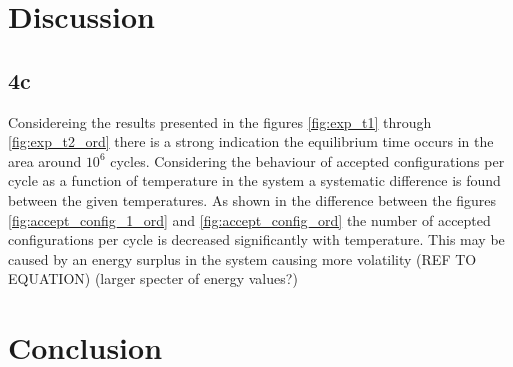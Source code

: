 \documentclass[12pt]{article}
\begin{document}
\section*{Discussion}

\subsection{4c}
Considereing the results presented in the figures \ref{fig:exp_t1} through \ref{fig:exp_t2_ord} there is a strong indication the  equilibrium time occurs in the area around $10^6$ cycles. Considering the behaviour of accepted configurations per cycle as a function of temperature in the system a systematic difference is found between the given temperatures. As shown in the difference between the figures \ref{fig:accept_config_1_ord} and \ref{fig:accept_config_ord} the number of accepted configurations per cycle is decreased significantly with temperature. This may be caused by an energy surplus in the  system causing more volatility (REF TO  EQUATION) (larger specter of energy values?)  
\section*{Conclusion}
\end{document}
